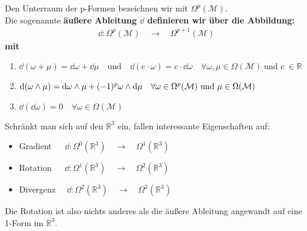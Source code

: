 Den Unterraum der p-Formen bezeichnen wir mit $\Omega^p(\mathcal{M})$. \\
Die sogenannte \bfseries äußere Ableitung $\dd$ \normalfont definieren wir über die Abbildung:
\begin{align*}
\dd: \Omega^p(\mathcal{M}) \quad \rightarrow \quad  \Omega^{p+1}(\mathcal{M})
\end{align*}
\centering mit
\begin{enumerate}
\item $\dd(\omega + \mu) = \dd\omega + \dd\mu \quad \text{und} \quad \dd(\text{c}\cdot\omega) = \text{c}\cdot\dd\omega \quad \forall \omega, \mu \in \Omega(\mathcal{M}) \ \text{und c} \ \in \mathbb{R} $
\item $\dd(\omega \wedge \mu) = \dd \omega \wedge \mu + (-1)^p \omega \wedge \dd\mu \quad \forall \omega \in \Omega^p(\mathcal{M}) \ \text{und} \ \mu \in \Omega(\mathcal{M})$
\item $\dd(\dd \omega) = 0 \quad \forall \omega \in \Omega(\mathcal{M}) $
\end{enumerate}
\flushleft
Schränkt man sich auf den $\mathbb{R}^3$ ein, fallen interessante Eigenschaften auf:
\begin{itemize}
\bfseries
\item Gradient $\quad \ \dd: \Omega^0(\mathbb{R}^3) \quad \rightarrow \quad  \Omega^1(\mathbb{R}^3)$
\item Rotation $\quad \ \dd: \Omega^1(\mathbb{R}^3) \quad \rightarrow \quad  \Omega^2(\mathbb{R}^3)$
\item Divergenz $\quad \dd: \Omega^2(\mathbb{R}^3) \quad \rightarrow \quad  \Omega^3(\mathbb{R}^3)$
\end{itemize}
\normalfont
Die Rotation ist also nichts anderes als die äußere Ableitung angewandt auf eine 1-Form im $\mathbb{R}^3.$
